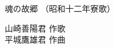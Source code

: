 \documentclass[10pt,b5j]{tarticle} %
\begin{document}
\begin{minipage}[c]{0.7\hsize} %
    \begin{center}
        {\LARGE
            魂の故郷 %
        }
        {\small 
            （昭和十二年寮歌） %
        }
    \end{center}
\end{minipage}
\begin{minipage}[c]{0.3\hsize} %
    \begin{flushright} %
        山崎善陽君 作歌\\平城鷹雄君 作曲 %
    \end{flushright}
\end{minipage}
\end{document}
